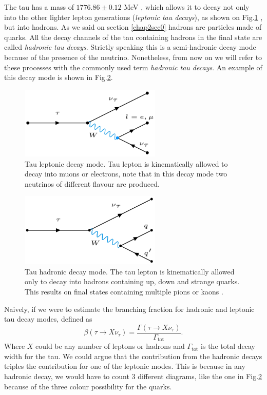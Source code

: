 The tau has a mass of $1776.86 \pm 0.12$ MeV \cite{PhysRevD.98.030001}, which allows it to decay not only into the other lighter lepton generations (\textit{leptonic tau decays}), as shown on Fig.\ref{Fig1}  , but into hadrons. As we said on section \ref{chap2sec0} hadrons are particles made of quarks. All the decay channels of the tau containing hadrons in the final state are called \textit{hadronic tau decays}. Strictly speaking this is a semi-hadronic decay mode because of the presence of the neutrino. Nonetheless, from now on we will refer to these processes with the commonly used term \textit{hadronic tau decays}. An example of this decay mode is shown in Fig.\ref{Fig2}.
\begin{figure}[h]
	\centering
	\includegraphics[width=0.6\textwidth]{figures/Fig1}
	\caption{Tau leptonic decay mode. Tau lepton is kinematically allowed to decay into muons or electrons, note that in this decay mode two neutrinos of different flavour are produced.}
	\label{Fig1}
\end{figure}
\begin{figure}[h]
	\centering
	\includegraphics[width=0.6\textwidth]{figures/Fig2}
	\caption{Tau hadronic decay mode. The tau lepton is kinematically allowed only to decay into hadrons containing up, down and strange quarks. This results on final states containing multiple pions or kaons \cite{Davier_2006}.}
	\label{Fig2}
\end{figure}
Naively, if we were to estimate the branching fraction for hadronic and leptonic tau decay modes, defined as
\begin{equation}
	\beta(\tau\to X\nu_\tau)=\frac{\Gamma(\tau\to X\nu_\tau)}{\Gamma_{\text{tot}}}.
\end{equation}
Where $X$ could be any number of leptons or hadrons and $\Gamma_{\text{tot}}$ is the total decay width for the tau. We could argue that the contribution from the hadronic decays triples the contribution for one of the leptonic modes. This is because in any hadronic decay, we would have to count 3 different diagrams, like the one in Fig.\ref{Fig2} because of the three colour possibility for the quarks.

